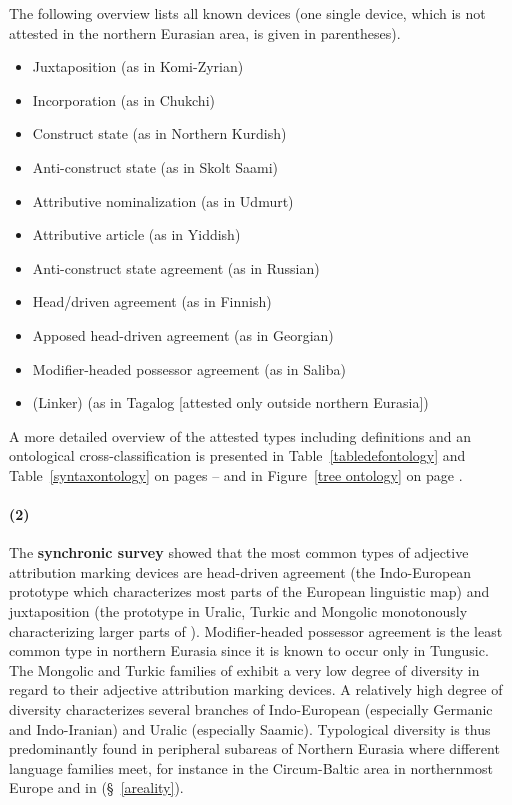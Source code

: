 The following overview lists all known devices (one single device, which is not attested in the northern Eurasian area, is given in parentheses).
\begin{itemize}
\item{Juxtaposition} (as in Komi-Zyrian)
\item{Incorporation} (as in Chukchi)
\item{Construct state} (as in Northern Kurdish)
\item{Anti-construct state} (as in Skolt Saami)
\item{Attributive nominalization} (as in Udmurt)
\item{Attributive article} (as in Yiddish)
\item{Anti-construct state agreement} (as in Russian)
\item{Head\slash{}driven agreement} (as in Finnish)
\item{Apposed head\hyp{}driven agreement} (as in Georgian)
\item{Modifier-headed possessor agreement} (as in Saliba)%
\item{(Linker)} (as in Tagalog [attested only outside northern Eurasia])
\end{itemize}
A more detailed overview of the attested types including definitions and an ontological cross-classification is presented in Table~\ref{tabledefontology} and Table~\ref{syntaxontology} on pages \pageref{tabledefontology}–\pageref{syntaxontology} and in Figure~\ref{tree ontology} on page \pageref{tree ontology}.

\paragraph{(2)}
The \textbf{synchronic survey} showed that the most common types of adjective attribution marking devices are head\hyp{}driven agreement (the Indo\hyp{}European prototype which characterizes most parts of the European linguistic map) and juxtaposition (the prototype in Uralic, Turkic and Mongolic monotonously characterizing larger parts of ). Modifier-headed possessor agreement is the least common type in northern Eurasia since it is known to occur only in Tungusic. The Mongolic and Turkic families of  exhibit a very low degree of diversity in regard to their adjective attribution marking devices. A relatively high degree of diversity characterizes several branches of Indo-European (especially Germanic and Indo-Iranian) and Uralic (especially Saamic). Typological diversity is thus predominantly found in peripheral subareas of Northern Eurasia where different language families meet, for instance in the Circum-Baltic area in northernmost Europe and in  (\S~\ref{areality}).

